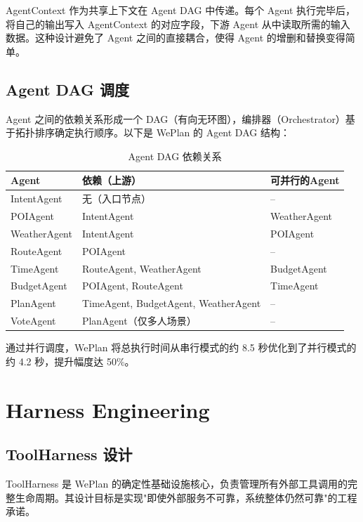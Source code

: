 \documentclass[12pt,a4paper]{ctexart}
\begin{document}
AgentContext 作为共享上下文在 Agent DAG 中传递。每个 Agent 执行完毕后，将自己的输出写入 AgentContext 的对应字段，下游 Agent 从中读取所需的输入数据。这种设计避免了 Agent 之间的直接耦合，使得 Agent 的增删和替换变得简单。

\subsection{Agent DAG 调度}

Agent 之间的依赖关系形成一个 DAG（有向无环图），编排器（Orchestrator）基于拓扑排序确定执行顺序。以下是 WePlan 的 Agent DAG 结构：

\begin{table}[H]
\centering
\caption{Agent DAG 依赖关系}
\label{tab:agent-dag}
\renewcommand{\arraystretch}{1.3}
{\small
\begin{tabular}{p{3cm} p{4cm} p{5cm}}
\toprule
\textbf{Agent} & \textbf{依赖（上游）} & \textbf{可并行的Agent} \\
\midrule
IntentAgent & 无（入口节点） & -- \\
POIAgent & IntentAgent & WeatherAgent \\
WeatherAgent & IntentAgent & POIAgent \\
RouteAgent & POIAgent & -- \\
TimeAgent & RouteAgent, WeatherAgent & BudgetAgent \\
BudgetAgent & POIAgent, RouteAgent & TimeAgent \\
PlanAgent & TimeAgent, BudgetAgent, WeatherAgent & -- \\
VoteAgent & PlanAgent（仅多人场景） & -- \\
\bottomrule
\end{tabular}
}
\end{table}

通过并行调度，WePlan 将总执行时间从串行模式的约 8.5 秒优化到了并行模式的约 4.2 秒，提升幅度达 50\%。

\newpage

\section{Harness Engineering}

\subsection{ToolHarness 设计}

ToolHarness 是 WePlan 的确定性基础设施核心，负责管理所有外部工具调用的完整生命周期。其设计目标是实现"即使外部服务不可靠，系统整体仍然可靠"的工程承诺。
\end{document}
